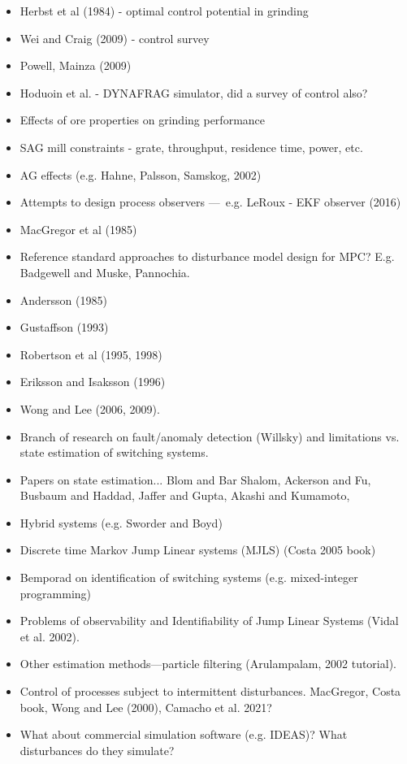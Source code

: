 \begin{itemize}
	\item Herbst et al (1984) - optimal control potential in grinding
	\item Wei and Craig (2009) - control survey
	\item Powell, Mainza (2009)
	\item Hoduoin et al. - DYNAFRAG simulator, did a survey of control also?
	\item Effects of ore properties on grinding performance
	\item SAG mill constraints - grate, throughput, residence time, power, etc.
	\item AG effects (e.g. Hahne, Palsson, Samskog, 2002)
	\item Attempts to design process observers — e.g. LeRoux - EKF observer (2016)
	\item MacGregor et al (1985)
	\item Reference standard approaches to disturbance model design for MPC?  E.g. Badgewell and Muske, Pannochia.
	\item Andersson (1985)
	\item Gustaffson (1993)
	\item Robertson et al (1995, 1998)
	\item Eriksson and Isaksson (1996)
	\item Wong and Lee (2006, 2009).
	\item Branch of research on fault/anomaly detection (Willsky) and limitations vs. state estimation of switching systems.
	\item Papers on state estimation... Blom and Bar Shalom, Ackerson and Fu, Busbaum and Haddad, Jaffer and Gupta, Akashi and Kumamoto,
	\item Hybrid systems (e.g. Sworder and Boyd)
	\item Discrete time Markov Jump Linear systems (MJLS) (Costa 2005 book)
	\item Bemporad on identification of switching systems (e.g. mixed-integer programming)
	\item Problems of observability and Identifiability of Jump Linear Systems (Vidal et al. 2002).
	\item Other estimation methods—particle filtering (Arulampalam, 2002 tutorial).
	\item Control of processes subject to intermittent disturbances. MacGregor, Costa book, Wong and Lee (2000), Camacho et al. 2021?
	\item What about commercial simulation software (e.g. IDEAS)? What disturbances do they simulate?
\end{itemize}


